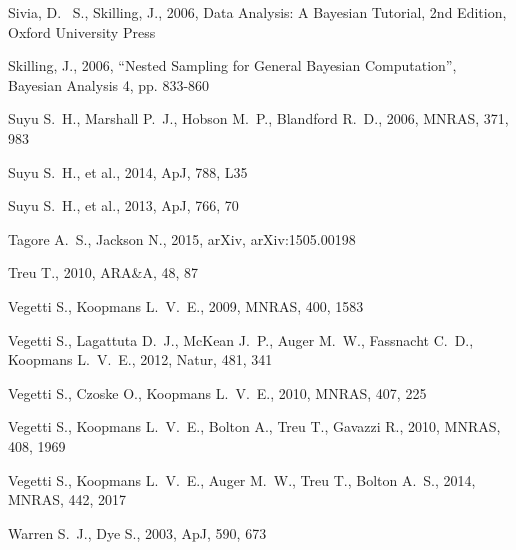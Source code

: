 \documentclass[useAMS,usenatbib]{mn2e}
\begin{document}
\begin{thebibliography}{99}
 Sivia, 
D.~ S., Skilling, J., 2006, Data Analysis: A Bayesian Tutorial, 2nd 
Edition, Oxford University Press

 Skilling, 
J., 2006, ``Nested Sampling for General Bayesian Computation'', Bayesian 
Analysis 4, pp. 833-860

Suyu S.~H., Marshall P.~J., Hobson M.~P., Blandford R.~D., 2006, MNRAS, 
371, 983

Suyu S.~H., et al., 2014, ApJ, 788, L35 

Suyu S.~H., et al., 2013, ApJ, 766, 70 

 Tagore A.~S., Jackson N., 2015, arXiv, arXiv:1505.00198

 Treu T., 2010, ARA\&A, 48, 87 

 Vegetti S., Koopmans L.~V.~E., 2009, MNRAS, 400, 1583

 Vegetti S., Lagattuta D.~J., McKean J.~P., 
Auger M.~W., Fassnacht C.~D., Koopmans L.~V.~E., 2012, Natur, 481, 341 

 Vegetti S., Czoske O., Koopmans L.~V.~E., 2010, MNRAS, 407, 225

 Vegetti S., Koopmans L.~V.~E., Bolton A., 
Treu T., Gavazzi R., 2010, MNRAS, 408, 1969 

 Vegetti S., Koopmans L.~V.~E., Auger 
M.~W., Treu T., Bolton A.~S., 2014, MNRAS, 442, 2017 


 Warren S.~J., Dye S., 2003, ApJ, 590, 673
\end{thebibliography}
\end{document}
